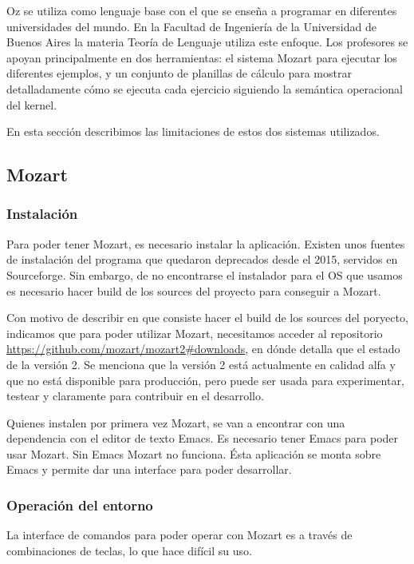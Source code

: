 \documentclass[a4paper,11pt]{article}
\begin{document}
Oz se utiliza como lenguaje base con el que se enseña a programar en diferentes universidades del mundo. En la Facultad de Ingeniería de la Universidad de Buenos Aires la materia Teoría de Lenguaje utiliza este enfoque. Los profesores se apoyan principalmente en dos herramientas: el sistema Mozart para ejecutar los diferentes ejemplos, y un conjunto de planillas de cálculo para mostrar detalladamente cómo se ejecuta cada ejercicio siguiendo la semántica operacional del kernel.

En esta sección describimos las limitaciones de estos dos sistemas utilizados.

\subsection{Mozart}

\subsubsection{Instalación}

Para poder tener Mozart, es necesario instalar la aplicación. Existen unos fuentes de instalación del programa que quedaron deprecados desde el 2015, servidos en Sourceforge. Sin embargo, de no encontrarse el instalador para el OS que usamos es necesario hacer build de los sources del proyecto para conseguir a Mozart.

Con motivo de describir en que consiste hacer el build de los sources del poryecto, indicamos que para poder utilizar Mozart, necesitamos acceder al repositorio \url{https://github.com/mozart/mozart2#downloads}, en dónde detalla que el estado de la versión 2. Se menciona que la versión 2 está actualmente en calidad alfa y que no está disponible para producción, pero puede ser usada para experimentar, testear y claramente para contribuir en el desarrollo.

Quienes instalen por primera vez Mozart, se van a encontrar con una dependencia con el editor de texto Emacs. Es necesario tener Emacs para poder usar Mozart. Sin Emacs Mozart no funciona. Ésta aplicación se monta sobre Emacs y permite dar una interface para poder desarrollar.

\subsubsection{Operación del entorno}

La interface de comandos para poder operar con Mozart es a través de combinaciones de teclas, lo que hace difícil su uso.
\end{document}

